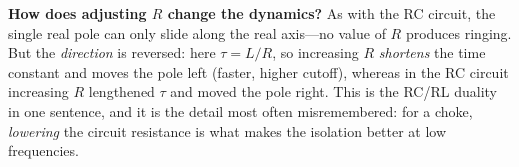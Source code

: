 \begin{physicalbox}
\textbf{How does adjusting \(R\) change the dynamics?} As with the RC circuit, the
single real pole can only slide along the real axis---no value of \(R\) produces
ringing. But the \emph{direction} is reversed: here \(\tau=L/R\), so increasing
\(R\) \emph{shortens} the time constant and moves the pole left (faster, higher
cutoff), whereas in the RC circuit increasing \(R\) lengthened \(\tau\) and moved
the pole right. This is the RC/RL duality in one sentence, and it is the detail most
often misremembered: for a choke, \emph{lowering} the circuit resistance is what
makes the isolation better at low frequencies.
\end{physicalbox}
